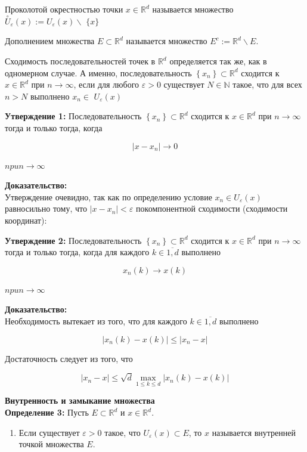 \documentclass[a4paper,12pt]{article} %
\begin{document}
Проколотой окрестностью точки $x \in \mathbb{R}^{d}$ называется множество $\stackrel{\circ}{U}_{\varepsilon}(x):=U_{\varepsilon}(x) \backslash$ $\{x\}$

Дополнением множества $E \subset \mathbb{R}^{d}$ называется множество $E^{c}:=\mathbb{R}^{d} \backslash E$.

Сходимость последовательностей точек в $\mathbb{R}^{d}$ определяется так же, как в одномерном случае. А именно, последовательность $\left\{x_{n}\right\} \subset \mathbb{R}^{d}$ сходится к $x \in \mathbb{R}^{d}$ при $n \rightarrow \infty$, если для любого $\varepsilon>0$ существует $N \in \mathbb{N}$ такое, что для всех $n>N$ выполнено $x_{n} \in$ $U_{\varepsilon}(x)$

\textbf{Утверждение 1:} Последовательность $\left\{x_{n}\right\} \subset \mathbb{R}^{d}$ сходится к $x \in \mathbb{R}^{d}$ при $n \rightarrow \infty$ тогда и только тогда, когда

$$
\left|x-x_{n}\right| \rightarrow 0
$$

$n p u n \rightarrow \infty$

\textbf{Доказательство:}\\
Утверждение очевидно, так как по определению условие $x_{n} \in U_{\varepsilon}(x)$ равносильно тому, что $\left|x-x_{n}\right|<\varepsilon$
покомпонентной сходимости (сходимости координат):

\textbf{Утверждение 2:} Последовательность $\left\{x_{n}\right\} \subset \mathbb{R}^{d}$ сходится к $x \in \mathbb{R}^{d}$ при $n \rightarrow \infty$ тогда и только тогда, когда для каждого $k \in \overline{1, d}$ выполнено

$$
x_{n}(k) \rightarrow x(k)
$$

$n p u n \rightarrow \infty$

\textbf{Доказательство:}\\
Необходимость вытекает из того, что для каждого $k \in \overline{1, d}$ выполнено

$$
\left|x_{n}(k)-x(k)\right| \leq\left|x_{n}-x\right|
$$

Достаточность следует из того, что

$$
\left|x_{n}-x\right| \leq \sqrt{d} \max _{1 \leq k \leq d}\left|x_{n}(k)-x(k)\right|
$$

\textbf{Внутренность и замыкание множества}\\
\textbf{Определение 3:} Пусть $E \subset \mathbb{R}^{d}$ и $x \in \mathbb{R}^{d}$.

\begin{enumerate}
  \item Если существует $\varepsilon>0$ такое, что $U_{\varepsilon}(x) \subset E$, то $x$ называется внутренней точкой множества $E$.
\end{enumerate}
\end{document}

